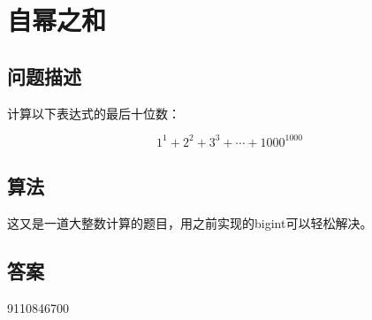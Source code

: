 \section{自幂之和}
\subsection{问题描述}
\begin{tcolorbox}

计算以下表达式的最后十位数：

\[
1^1 + 2^2 + 3^3 + \cdots + 1000^{1000}
\]


\end{tcolorbox}

\subsection{算法}
这又是一道大整数计算的题目，用之前实现的bigint可以轻松解决。


\subsection{答案}
9110846700
